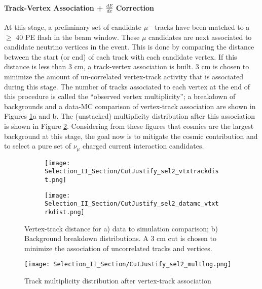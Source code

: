 \paragraph{Track-Vertex Association + $\frac{dE}{dx}$ Correction}
At this stage, a preliminary set of candidate $\mu^-$ tracks have been matched to a $\geq$ 40 PE flash in the beam window. These $\mu$ candidates are next associated to candidate neutrino vertices in the event. This is done by comparing the distance between the start (or end) of each track with each candidate vertex. If this distance is less than 3 cm, a track-vertex association is built. 3 cm is chosen to minimize the amount of un-correlated vertex-track activity that is associated during this stage.  The number of tracks associated to each vertex at the end of this procedure is called the ``observed vertex multiplicity''; a breakdown of backgrounds and a data-MC comparison of vertex-track association are shown in Figures \ref{fig:cutjust_sel2_vtxtrackdist}a and b.  The (unstacked) multiplicity distribution after this association is shown in Figure \ref{fig:cutjust_sel2_mult}. Considering from these figures that cosmics are the largest background at this stage, the goal now is to mitigate the cosmic contribution and to select a pure set of $\nu_{\mu}$ charged current interaction candidates.
\begin{figure}[h!]
  \begin{subfigure}[t]{0.4\textwidth}
\texttt{[image: Selection\_II\_Section/CutJustify\_sel2\_vtxtrackdist.png]}
    \caption{ }
  \end{subfigure} 
  \hspace{10 mm}
  \begin{subfigure}[t]{0.4\textwidth}
\texttt{[image: Selection\_II\_Section/CutJustify\_sel2\_datamc\_vtxtrkdist.png]}
    \caption{ }
  \end{subfigure} 
\caption{ Vertex-track distance for a) data to simulation comparison; b) Background breakdown distributions.  A 3 cm cut is chosen to minimize the association of uncorrelated tracks and vertices. }
\label{fig:cutjust_sel2_vtxtrackdist}
\end{figure}

\begin{figure}[h!]
\centering
\texttt{[image: Selection\_II\_Section/CutJustify\_sel2\_multlog.png]}
    \caption{ }
\caption{ Track multiplicity distribution after vertex-track association }
\label{fig:cutjust_sel2_mult}
\end{figure}

